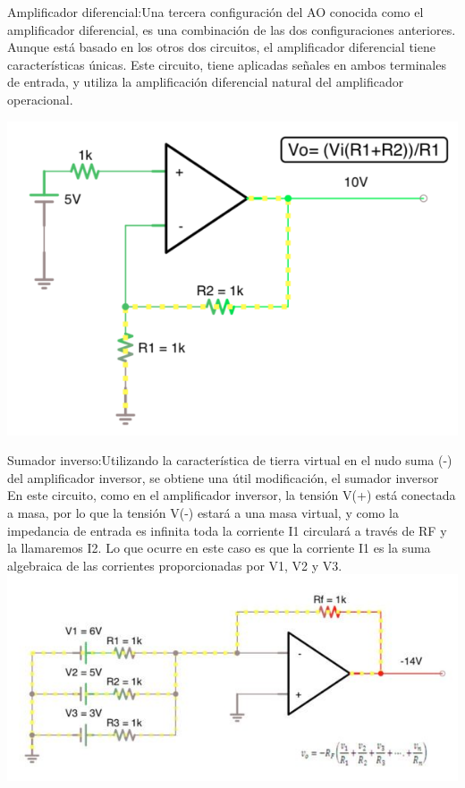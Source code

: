 \documentclass[12pt,a4paper]{article}
\begin{document}
\begin{flushleft}
Amplificador diferencial:Una tercera configuración del AO conocida como el amplificador diferencial, es una combinación de las dos configuraciones anteriores. Aunque está basado en los otros dos circuitos, el amplificador diferencial tiene características únicas. Este circuito, tiene aplicadas señales en ambos terminales de entrada, y utiliza la amplificación diferencial natural del amplificador operacional.

\includegraphics[wedth=7cm]{3.png} 
\end{flushleft}
\begin{flushleft}
Sumador inverso:Utilizando la característica de tierra virtual en el nudo suma (-) del amplificador inversor, se obtiene una útil modificación, el sumador inversor
En este circuito, como en el amplificador inversor, la tensión V(+) está conectada a masa, por lo que la tensión V(-) estará a una masa virtual, y como la impedancia de entrada es infinita toda la corriente I1 circulará a través de RF y la llamaremos I2. Lo que ocurre en este caso es que la corriente I1 es la suma algebraica de las corrientes proporcionadas por V1, V2 y V3.
\includegraphics[scale=1]{sumainver.jpg} 
\end{flushleft}
\end{document}
